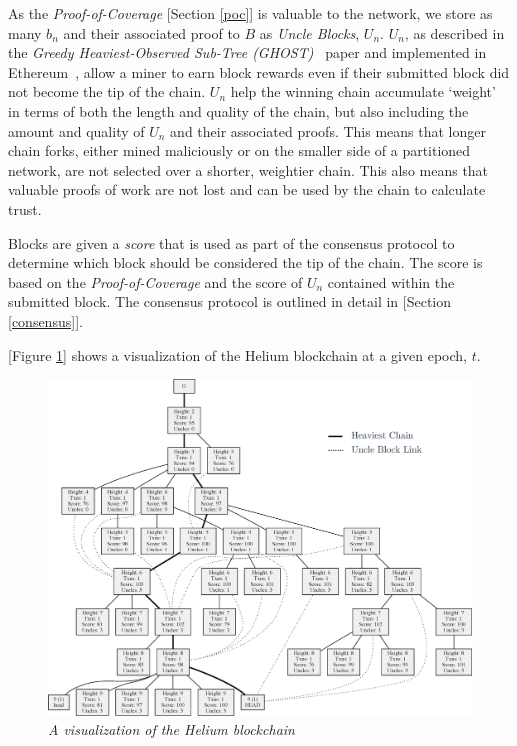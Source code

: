 \documentclass[10pt, nonatbib, nocopyrightspace, reprint]{sigplanconf}
\begin{document}
As the \emph{Proof-of-Coverage} [Section \ref{poc}] is valuable to the network, we store as many $b_n$ and their associated proof to $B$ as \emph{Uncle Blocks}, $U_n$. $U_n$, as described in the \emph{Greedy Heaviest-Observed Sub-Tree (GHOST)}~\cite{ghost} paper and implemented in Ethereum~\cite{ethereum}, allow a miner to earn block rewards even if their submitted block did not become the tip of the chain. $U_n$ help the winning chain accumulate `weight' in terms of both the length and quality of the chain, but also including the amount and quality of $U_n$ and their associated proofs. This means that longer chain forks, either mined maliciously or on the smaller side of a partitioned network, are not selected over a shorter, weightier chain. This also means that valuable proofs of work are not lost and can be used by the chain to calculate trust.

Blocks are given a \emph{score} that is used as part of the consensus protocol to determine which block should be considered the tip of the chain. The score is based on the \emph{Proof-of-Coverage} and the score of $U_n$ contained within the submitted block. The consensus protocol is outlined in detail in [Section \ref{consensus}].

[Figure \ref{fig:chain}] shows a visualization of the Helium blockchain at a given epoch, $t$.

\begin{figure}[h]
    \begin{center}
          \includegraphics[width=\textwidth]{chain.eps}
          \caption{\emph{A visualization of the Helium blockchain}}
          \label{fig:chain}
     \end{center}
\end{figure}
\end{document}
